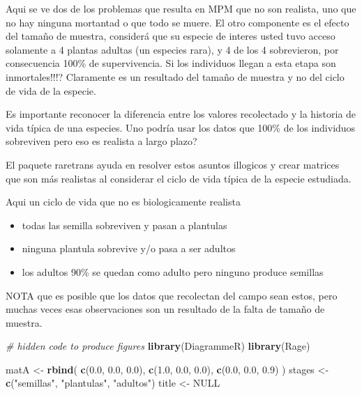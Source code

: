 \documentclass[
]{book}
\newenvironment{Shaded}{\begin{snugshade}}{\end{snugshade}}
\newcommand{\CommentTok}[1]{\textcolor[rgb]{0.56,0.35,0.01}{\textit{#1}}}
\newcommand{\ConstantTok}[1]{\textcolor[rgb]{0.56,0.35,0.01}{#1}}
\newcommand{\FloatTok}[1]{\textcolor[rgb]{0.00,0.00,0.81}{#1}}
\newcommand{\FunctionTok}[1]{\textcolor[rgb]{0.13,0.29,0.53}{\textbf{#1}}}
\newcommand{\NormalTok}[1]{#1}
\newcommand{\OtherTok}[1]{\textcolor[rgb]{0.56,0.35,0.01}{#1}}
\newcommand{\StringTok}[1]{\textcolor[rgb]{0.31,0.60,0.02}{#1}}
\providecommand{\tightlist}{%
  \setlength{\itemsep}{0pt}\setlength{\parskip}{0pt}}
\theoremstyle{definition}
\theoremstyle{definition}
\theoremstyle{definition}
\theoremstyle{definition}
\theoremstyle{remark}
\begin{document}
Aqui se ve dos de los problemas que resulta en MPM que no son realista, uno que no hay ninguna mortantad o que todo se muere. El otro componente es el efecto del tamaño de muestra, considerá que su especie de interes usted tuvo acceso solamente a 4 plantas adultas (un especies rara), y 4 de los 4 sobrevieron, por consecuencia 100\% de supervivencia. Si los individuos llegan a esta etapa son inmortales!!!? Claramente es un resultado del tamaño de muestra y no del ciclo de vida de la especie.

Es importante reconocer la diferencia entre los valores recolectado y la historia de vida típica de una especies. Uno podría usar los datos que 100\% de los individuos sobreviven pero eso es realista a largo plazo?

El paquete raretrans ayuda en resolver estos asuntos illogicos y crear matrices que son más realistas al considerar el ciclo de vida típica de la especie estudiada.

Aqui un ciclo de vida que no es biologicamente realista

\begin{itemize}
\tightlist
\item
  todas las semilla sobreviven y pasan a plantulas
\item
  ninguna plantula sobrevive y/o pasa a ser adultos
\item
  los adultos 90\% se quedan como adulto pero ninguno produce semillas
\end{itemize}

NOTA que es posible que los datos que recolectan del campo sean estos, pero muchas veces esas observaciones son un resultado de la falta de tamaño de muestra.

\begin{Shaded}
\begin{Highlighting}[]
\CommentTok{\# hidden code to produce figures}
\FunctionTok{library}\NormalTok{(DiagrammeR)}
\FunctionTok{library}\NormalTok{(Rage)}


\NormalTok{matA }\OtherTok{\textless{}{-}} \FunctionTok{rbind}\NormalTok{(}
  \FunctionTok{c}\NormalTok{(}\FloatTok{0.0}\NormalTok{, }\FloatTok{0.0}\NormalTok{, }\FloatTok{0.0}\NormalTok{),}
  \FunctionTok{c}\NormalTok{(}\FloatTok{1.0}\NormalTok{, }\FloatTok{0.0}\NormalTok{, }\FloatTok{0.0}\NormalTok{),}
  \FunctionTok{c}\NormalTok{(}\FloatTok{0.0}\NormalTok{, }\FloatTok{0.0}\NormalTok{, }\FloatTok{0.9}\NormalTok{)}
\NormalTok{)}
\NormalTok{stages }\OtherTok{\textless{}{-}} \FunctionTok{c}\NormalTok{(}\StringTok{"semillas"}\NormalTok{, }\StringTok{"plantulas"}\NormalTok{, }\StringTok{"adultos"}\NormalTok{)}
\NormalTok{title }\OtherTok{\textless{}{-}} \ConstantTok{NULL}
\end{Highlighting}
\end{Shaded}
\end{document}
